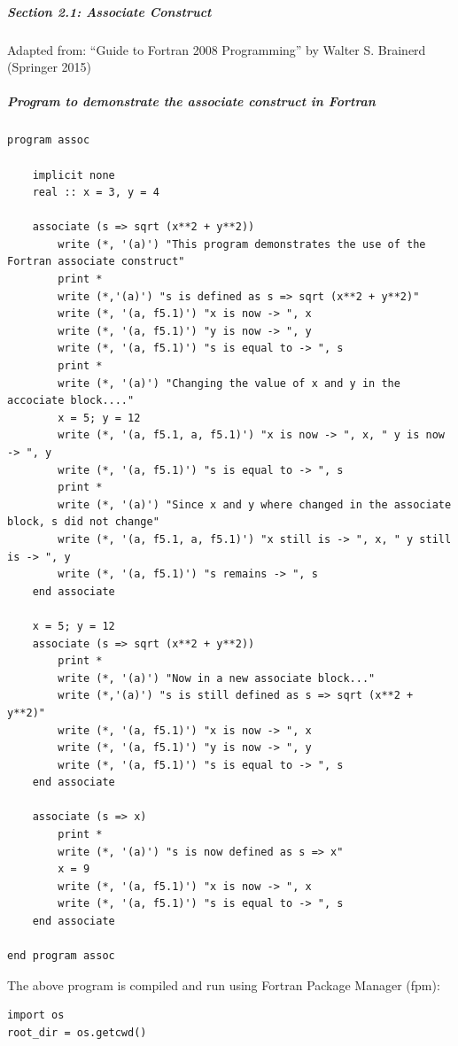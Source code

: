 \subparagraph{Section 2.1: Associate Construct}

Adapted from: ``Guide to Fortran 2008 Programming'' by Walter S. Brainerd (Springer 2015)

\subparagraph{Program to demonstrate the \textbf{associate} construct in Fortran}

\begin{verbatim}
program assoc

    implicit none
    real :: x = 3, y = 4

    associate (s => sqrt (x**2 + y**2))
        write (*, '(a)') "This program demonstrates the use of the Fortran associate construct"
        print *
        write (*,'(a)') "s is defined as s => sqrt (x**2 + y**2)"
        write (*, '(a, f5.1)') "x is now -> ", x
        write (*, '(a, f5.1)') "y is now -> ", y
        write (*, '(a, f5.1)') "s is equal to -> ", s 
        print *        
        write (*, '(a)') "Changing the value of x and y in the accociate block...."
        x = 5; y = 12
        write (*, '(a, f5.1, a, f5.1)') "x is now -> ", x, " y is now -> ", y
        write (*, '(a, f5.1)') "s is equal to -> ", s 
        print *
        write (*, '(a)') "Since x and y where changed in the associate block, s did not change"
        write (*, '(a, f5.1, a, f5.1)') "x still is -> ", x, " y still is -> ", y
        write (*, '(a, f5.1)') "s remains -> ", s
    end associate

    x = 5; y = 12
    associate (s => sqrt (x**2 + y**2))
        print *
        write (*, '(a)') "Now in a new associate block..."
        write (*,'(a)') "s is still defined as s => sqrt (x**2 + y**2)"
        write (*, '(a, f5.1)') "x is now -> ", x                           
        write (*, '(a, f5.1)') "y is now -> ", y
        write (*, '(a, f5.1)') "s is equal to -> ", s
    end associate

    associate (s => x)
        print *
        write (*, '(a)') "s is now defined as s => x"
        x = 9
        write (*, '(a, f5.1)') "x is now -> ", x
        write (*, '(a, f5.1)') "s is equal to -> ", s
    end associate

end program assoc
\end{verbatim}

The above program is compiled and run using Fortran Package Manager (fpm):

\begin{verbatim}
import os
root_dir = os.getcwd()
\end{verbatim}

